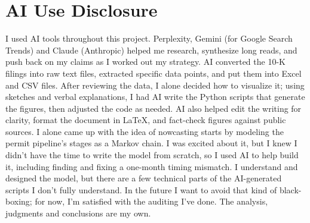 \begin{itemize}[leftmargin=0pt, itemindent=1.6em, label={}, itemsep=0.5pt, parsep=0pt]


\end{itemize}
\normalsize

\section{AI Use Disclosure}
\footnotesize
I used AI tools throughout this project. Perplexity, Gemini (for Google Search Trends) and Claude (Anthropic) helped me research, synthesize long reads, and push back on my claims as I worked out my strategy. AI converted the 10-K filings into raw text files, extracted specific data points, and put them into Excel and CSV files. After reviewing the data, I alone decided how to visualize it; using sketches and verbal explanations, I had AI write the Python scripts that generate the figures, then adjusted the code as needed. AI also helped edit the writing for clarity, format the document in LaTeX, and fact-check figures against public sources. I alone came up with the idea of nowcasting starts by modeling the permit pipeline's stages as a Markov chain. I was excited about it, but I knew I didn't have the time to write the model from scratch, so I used AI to help build it, including finding and fixing a one-month timing mismatch. I understand and designed the model, but there are a few technical parts of the AI-generated scripts I don't fully understand. In the future I want to avoid that kind of black-boxing; for now, I'm satisfied with the auditing I've done. The analysis, judgments and conclusions are my own.
\normalsize

